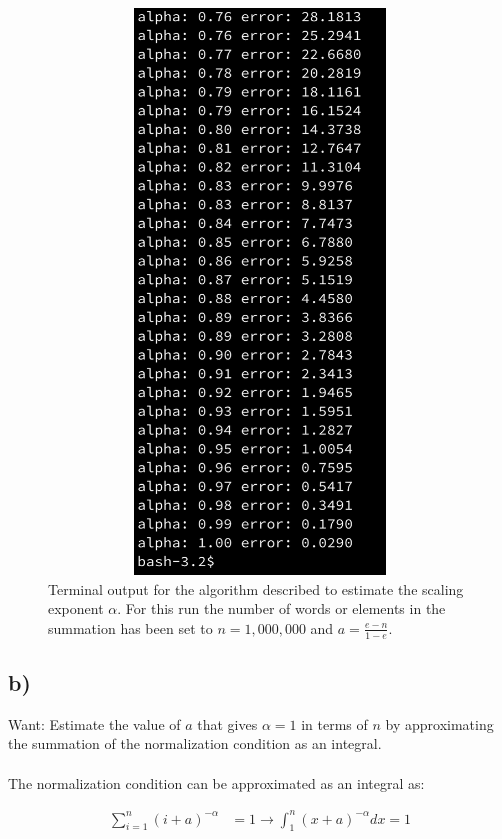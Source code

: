 \documentclass{article}
\begin{document}
\begin{figure}[h]
\includegraphics[height=15cm,width=15cm,keepaspectratio]{Q03/zipfaramaOutput_3b.png}
\caption{Terminal output for the algorithm described to estimate the scaling exponent $\alpha$. For this run the number of words or elements in the summation has been set to $n = 1,000,000$ and $a = \frac{e-n}{1-e}$. }
\label{fig:envelope}
\end{figure}

\subsection{b)}

Want: Estimate the value of $a$ that gives $\alpha = 1$ in terms of $n$ by approximating the summation of the normalization condition as an integral.\\
\\
The normalization condition can be approximated as an integral as:

\begin{align}
\sum_{i=1}^{n} (i+a)^{-\alpha} &= 1 \to \int_{1}^{n} (x+a)^{-\alpha} dx = 1
\end{align}
\end{document}
